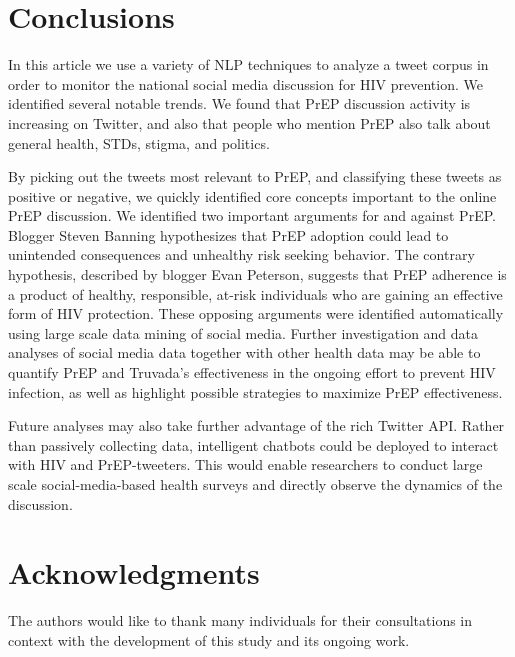 \documentclass[conference]{IEEEtran}
\begin{document}
\section{Conclusions}

In this article we use a variety of NLP techniques to analyze a tweet corpus in order to monitor the national social media discussion for HIV prevention. We identified several notable trends. We found that PrEP discussion activity is increasing on Twitter, and also that people who mention PrEP also talk about general health, STDs, stigma, and politics.

By picking out the tweets most relevant to PrEP, and classifying these tweets as positive or negative, we quickly identified core concepts important to the online PrEP discussion. We identified two important arguments for and against PrEP. Blogger Steven Banning hypothesizes that PrEP adoption could lead to unintended consequences and unhealthy risk seeking behavior. The contrary hypothesis, described by blogger Evan Peterson, suggests that PrEP adherence is a product of healthy, responsible, at-risk individuals who are gaining an effective form of HIV protection. These opposing arguments were identified automatically using large scale data mining of social media. Further investigation and data analyses of social media data together with other health data may be able to quantify PrEP and Truvada's effectiveness in the ongoing effort to prevent HIV infection, as well as highlight possible strategies to maximize PrEP effectiveness.

Future analyses may also take further advantage of the rich Twitter API. Rather than passively collecting data, intelligent chatbots could be deployed to interact with HIV and PrEP-tweeters. This would enable researchers to conduct large scale social-media-based health surveys and directly observe the dynamics of the discussion.



\section*{Acknowledgments}

The authors would like to thank many individuals for their consultations in context with the development of this study and its ongoing work.



\end{document}
